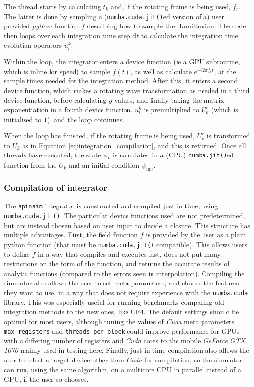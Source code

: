 \documentclass{jors}
\begin{document}
			The thread starts by calculating \(t_k\) and, if the rotating frame is being used, \(f_r\). The latter is done by sampling a (\texttt{numba.cuda.jit()}ed version of a) user provided \emph{python} function \(f\) describing how to sample the Hamiltonian. The code then loops over each integration time step \(\mathrm{d}t\) to calculate the integration time evolution operators \(u^k_l\).
			
			Within the loop, the integrator enters a device function (ie a GPU subroutine, which is inline for speed) to sample \(f(t)\), as well as calculate \(e^{-i 2 \pi f_r t}\), at the sample times needed for the integration method. After this, it enters a second device function, which makes a rotating wave transformation as needed in a third device function, before calculating \(g\) values, and finally taking the matrix exponentiation in a fourth device function. \(u^k_l\) is premultiplied to \(U^r_k\) (which is initialised to \(1\)), and the loop continues.
			
			When the loop has finished, if the rotating frame is being used, \(U^r_k\) is transformed to \(U_k\) as in Equation \eqref{eq:integration_compilation}, and this is returned. Once all threads have executed, the state \(\psi_k\) is calculated in a (CPU) \texttt{numba.jit()}ed function from the \(U_k\) and an initial condition \(\psi_{\mathrm{init}}\).
	
	
		\subsubsection{Compilation of integrator}
			The \texttt{spinsim} integrator is constructed and compiled just in time, using \texttt{numba.cuda.jit()}. The particular device functions used are not predetermined, but are instead chosen based on user input to decide a closure. This structure has multiple advantages. First, the field function \(f\) is provided by the user as a plain python function (that must be \texttt{numba.cuda.jit()} compatible). This allows users to define \(f\) in a way that compiles and executes fast, does not put many restrictions on the form of the function, and returns the accurate results of analytic functions (compared to the errors seen in interpolation). Compiling the simulator also allows the user to set meta parameters, and choose the features they want to use, in a way that does not require experience with the \texttt{numba.cuda} library. This was especially useful for running benchmarks comparing old integration methods to the new ones, like CF4. The default settings should be optimal for most users, although tuning the values of \emph{Cuda} meta parameters \texttt{max\_registers} and \texttt{threads\_per\_block} could improve performance for GPUs with a differing number of registers and \emph{Cuda} cores to the mobile \emph{GeForce GTX 1070} mainly used in testing here. Finally, just in time compilation also allows the user to select a target device other than \emph{Cuda} for compilation, so the simulator can run, using the same algorithm, on a multicore CPU in parallel instead of a GPU, if the user so chooses.
			
\end{document}
